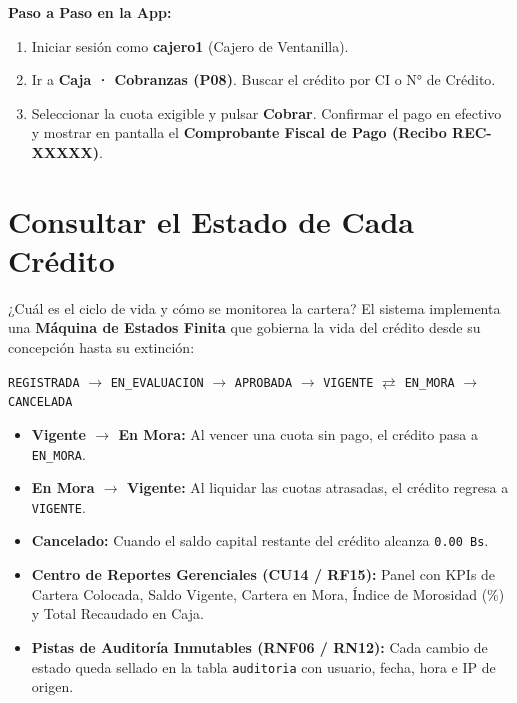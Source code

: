 \documentclass[11pt,letterpaper]{article}
\begin{document}
\begin{demobox}
\textbf{Paso a Paso en la App:}
\begin{enumerate}
    \item Iniciar sesión como \textbf{cajero1} (Cajero de Ventanilla).
    \item Ir a \textbf{Caja · Cobranzas (P08)}. Buscar el crédito por CI o N° de Crédito.
    \item Seleccionar la cuota exigible y pulsar \textbf{Cobrar}. Confirmar el pago en efectivo y mostrar en pantalla el \textbf{Comprobante Fiscal de Pago (Recibo REC-XXXXX)}.
\end{enumerate}
\end{demobox}

\section{Consultar el Estado de Cada Crédito}

\begin{respuestabox}{¿Cuál es el ciclo de vida y cómo se monitorea la cartera?}
El sistema implementa una \textbf{Máquina de Estados Finita} que gobierna la vida del crédito desde su concepción hasta su extinción:
\begin{center}
    \texttt{REGISTRADA} $\longrightarrow$ \texttt{EN\_EVALUACION} $\longrightarrow$ \texttt{APROBADA} $\longrightarrow$ \texttt{VIGENTE} $\rightleftarrows$ \texttt{EN\_MORA} $\longrightarrow$ \texttt{CANCELADA}
\end{center}
\begin{itemize}
    \item \textbf{Vigente $\to$ En Mora:} Al vencer una cuota sin pago, el crédito pasa a \texttt{EN\_MORA}.
    \item \textbf{En Mora $\to$ Vigente:} Al liquidar las cuotas atrasadas, el crédito regresa a \texttt{VIGENTE}.
    \item \textbf{Cancelado:} Cuando el saldo capital restante del crédito alcanza \texttt{0.00 Bs}.
    \item \textbf{Centro de Reportes Gerenciales (CU14 / RF15):} Panel con KPIs de Cartera Colocada, Saldo Vigente, Cartera en Mora, Índice de Morosidad (\%) y Total Recaudado en Caja.
    \item \textbf{Pistas de Auditoría Inmutables (RNF06 / RN12):} Cada cambio de estado queda sellado en la tabla \texttt{auditoria} con usuario, fecha, hora e IP de origen.
\end{itemize}
\end{respuestabox}
\end{document}
